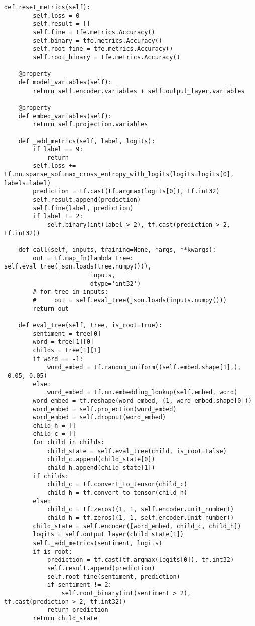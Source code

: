 \begin{lstlisting}[style=app]
    def reset_metrics(self):
        self.loss = 0
        self.result = []
        self.fine = tfe.metrics.Accuracy()
        self.binary = tfe.metrics.Accuracy()
        self.root_fine = tfe.metrics.Accuracy()
        self.root_binary = tfe.metrics.Accuracy()

    @property
    def model_variables(self):
        return self.encoder.variables + self.output_layer.variables

    @property
    def embed_variables(self):
        return self.projection.variables

    def _add_metrics(self, label, logits):
        if label == 9:
            return
        self.loss += tf.nn.sparse_softmax_cross_entropy_with_logits(logits=logits[0], labels=label)
        prediction = tf.cast(tf.argmax(logits[0]), tf.int32)
        self.result.append(prediction)
        self.fine(label, prediction)
        if label != 2:
            self.binary(int(label > 2), tf.cast(prediction > 2, tf.int32))

    def call(self, inputs, training=None, *args, **kwargs):
        out = tf.map_fn(lambda tree: self.eval_tree(json.loads(tree.numpy())),
                        inputs,
                        dtype='int32')
        # for tree in inputs:
        #     out = self.eval_tree(json.loads(inputs.numpy()))
        return out

    def eval_tree(self, tree, is_root=True):
        sentiment = tree[0]
        word = tree[1][0]
        childs = tree[1][1]
        if word == -1:
            word_embed = tf.random_uniform((self.embed.shape[1],), -0.05, 0.05)
        else:
            word_embed = tf.nn.embedding_lookup(self.embed, word)
        word_embed = tf.reshape(word_embed, (1, word_embed.shape[0]))
        word_embed = self.projection(word_embed)
        word_embed = self.dropout(word_embed)
        child_h = []
        child_c = []
        for child in childs:
            child_state = self.eval_tree(child, is_root=False)
            child_c.append(child_state[0])
            child_h.append(child_state[1])
        if childs:
            child_c = tf.convert_to_tensor(child_c)
            child_h = tf.convert_to_tensor(child_h)
        else:
            child_c = tf.zeros((1, 1, self.encoder.unit_number))
            child_h = tf.zeros((1, 1, self.encoder.unit_number))
        child_state = self.encoder([word_embed, child_c, child_h])
        logits = self.output_layer(child_state[1])
        self._add_metrics(sentiment, logits)
        if is_root:
            prediction = tf.cast(tf.argmax(logits[0]), tf.int32)
            self.result.append(prediction)
            self.root_fine(sentiment, prediction)
            if sentiment != 2:
                self.root_binary(int(sentiment > 2), tf.cast(prediction > 2, tf.int32))
            return prediction
        return child_state


\end{lstlisting}
